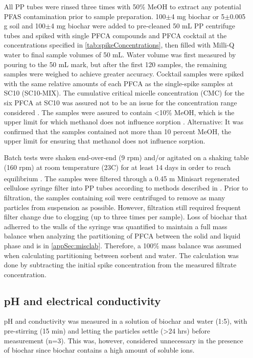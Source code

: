 All PP tubes were rinsed three times with 50\% MeOH to extract any potential PFAS contamination prior to sample preparation. 100$\pm$4 mg biochar or 5$\pm$0.005 g soil and 100$\pm$4 mg biochar were added to pre-cleaned 50 mL PP centrifuge tubes and spiked with single PFCA compounds and PFCA cocktail at the concentrations specified in \cref{tab:spikeConcentrations}, then filled with Milli-Q water to final sample volumes of 50 mL. Water volume was first measured by pouring to the 50 mL mark, but after the first 120 samples, the remaining samples were weighed to achieve greater accuracy. Cocktail samples were spiked with the same relative amounts of each PFCA as the single-spike samples at SC10 (SC10-MIX). The cumulative critical micelle concentration (CMC) for the six PFCA at SC10 was assured not to be an issue for the concentration range considered \citep{bhhatarai2011,ding2013physicochemical}. The samples were assured to contain \textless 10\% MeOH, which is the upper limit for which methanol does not influence sorption \citep{arvaniti2014}. Alternative: It was confirmed that the samples contained not more than 10 percent MeOH, the upper limit for ensuring that methanol does not influence sorption.

Batch tests were shaken end-over-end (9 rpm) and/or agitated on a shaking table (160 rpm) at room temperature (23\textdegree C) for at least 14 days in order to reach equilibrium \citep{higgins2006sorption}. The samples were filtered through a 0.45 \textmu m Minisart\textsuperscript{\textregistered} regenerated cellulose syringe filter into PP tubes according to methods described in \cite{Sorengard2019}. Prior to filtration, the samples containing soil were centrifuged to remove as many particles from suspension as possible. However, filtration still required frequent filter change due to clogging (up to three times per sample). Loss of biochar that adherred to the walls of the syringe was quantified to maintain a full mass balance when analyzing the partitioning of PFCA between the solid and liquid phase and is in \cref{appSec:misclab}. Therefore, a 100\% mass balance was assumed when calculating partitioning between sorbent and water. The calculation was done by subtracting the initial spike concentration from the measured filtrate concentration.

\subsection{pH and electrical conductivity}
pH and conductivity was measured in a solution of biochar and water (1:5), with pre-stirring (15 min) and letting the particles settle (\textgreater 24 hrs) before measurement (n=3). This was, however, considered unnecessary in the presence of biochar since biochar contains a high amount of soluble ions. 

